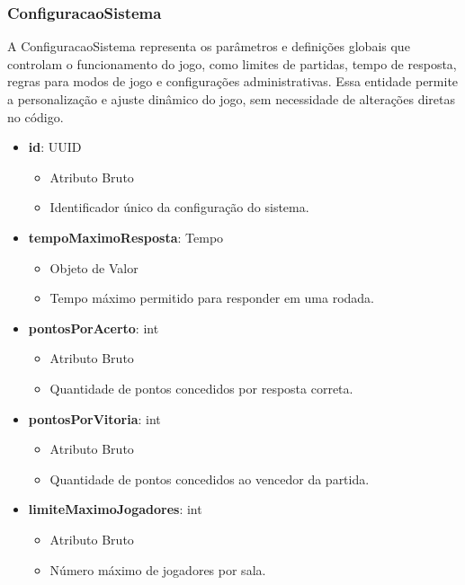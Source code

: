     \subsubsection{ConfiguracaoSistema}
    A ConfiguracaoSistema representa os parâmetros e definições globais que controlam o funcionamento do jogo, como limites de partidas, tempo de resposta, regras para modos de jogo e configurações administrativas. Essa entidade permite a personalização e ajuste dinâmico do jogo, sem necessidade de alterações diretas no código.
    \begin{itemize}
        \item \textbf{id}: UUID  
              \begin{itemize}
                  \item Atributo Bruto
                  \item Identificador único da configuração do sistema.
              \end{itemize}
    
        \item \textbf{tempoMaximoResposta}: Tempo  
              \begin{itemize}
                  \item Objeto de Valor
                  \item Tempo máximo permitido para responder em uma rodada.
              \end{itemize}
    
        \item \textbf{pontosPorAcerto}: int  
              \begin{itemize}
                  \item Atributo Bruto
                  \item Quantidade de pontos concedidos por resposta correta.
              \end{itemize}
    
        \item \textbf{pontosPorVitoria}: int  
              \begin{itemize}
                  \item Atributo Bruto
                  \item Quantidade de pontos concedidos ao vencedor da partida.
              \end{itemize}
    
        \item \textbf{limiteMaximoJogadores}: int  
              \begin{itemize}
                  \item Atributo Bruto
                  \item Número máximo de jogadores por sala.
              \end{itemize}
    

\end{itemize}
